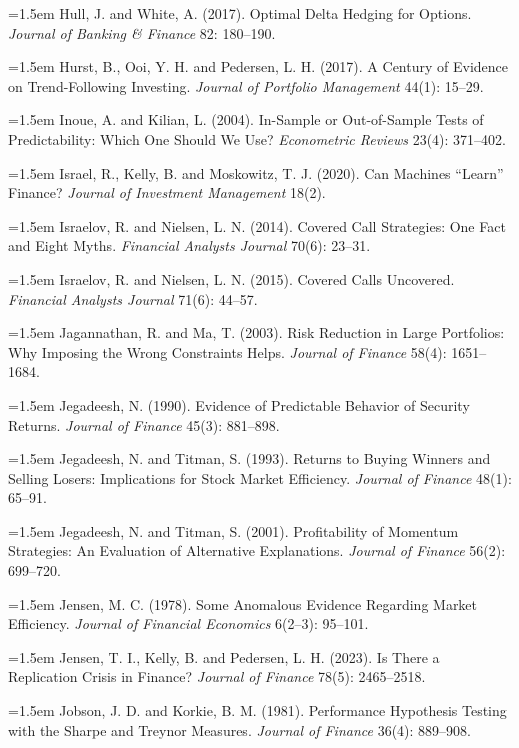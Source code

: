 \hangindent=1.5em Hull, J. and White, A. (2017). Optimal Delta Hedging for Options. \emph{Journal of Banking \& Finance} 82: 180--190.

\hangindent=1.5em Hurst, B., Ooi, Y. H. and Pedersen, L. H. (2017). A Century of Evidence on Trend-Following Investing. \emph{Journal of Portfolio Management} 44(1): 15--29.

\hangindent=1.5em Inoue, A. and Kilian, L. (2004). In-Sample or Out-of-Sample Tests of Predictability: Which One Should We Use? \emph{Econometric Reviews} 23(4): 371--402.

\hangindent=1.5em Israel, R., Kelly, B. and Moskowitz, T. J. (2020). Can Machines ``Learn'' Finance? \emph{Journal of Investment Management} 18(2).

\hangindent=1.5em Israelov, R. and Nielsen, L. N. (2014). Covered Call Strategies: One Fact and Eight Myths. \emph{Financial Analysts Journal} 70(6): 23--31.

\hangindent=1.5em Israelov, R. and Nielsen, L. N. (2015). Covered Calls Uncovered. \emph{Financial Analysts Journal} 71(6): 44--57.

\hangindent=1.5em Jagannathan, R. and Ma, T. (2003). Risk Reduction in Large Portfolios: Why Imposing the Wrong Constraints Helps. \emph{Journal of Finance} 58(4): 1651--1684.

\hangindent=1.5em Jegadeesh, N. (1990). Evidence of Predictable Behavior of Security Returns. \emph{Journal of Finance} 45(3): 881--898.

\hangindent=1.5em Jegadeesh, N. and Titman, S. (1993). Returns to Buying Winners and Selling Losers: Implications for Stock Market Efficiency. \emph{Journal of Finance} 48(1): 65--91.

\hangindent=1.5em Jegadeesh, N. and Titman, S. (2001). Profitability of Momentum Strategies: An Evaluation of Alternative Explanations. \emph{Journal of Finance} 56(2): 699--720.

\hangindent=1.5em Jensen, M. C. (1978). Some Anomalous Evidence Regarding Market Efficiency. \emph{Journal of Financial Economics} 6(2--3): 95--101.

\hangindent=1.5em Jensen, T. I., Kelly, B. and Pedersen, L. H. (2023). Is There a Replication Crisis in Finance? \emph{Journal of Finance} 78(5): 2465--2518.

\hangindent=1.5em Jobson, J. D. and Korkie, B. M. (1981). Performance Hypothesis Testing with the Sharpe and Treynor Measures. \emph{Journal of Finance} 36(4): 889--908.

